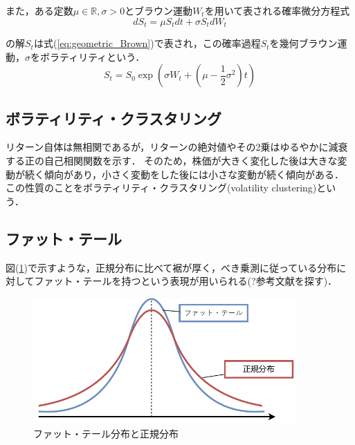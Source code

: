 \documentclass[titlepage]{jsreport}
\begin{document}
また，ある定数$\mu \in \mathbb{R}, \sigma > 0$とブラウン運動$W_t$を用いて表される確率微分方程式
\begin{equation}
    dS_t = \mu S_t dt + \sigma S_t dW_t \label{eq:geoBrow_equation}
\end{equation}

の解$S_t$は式(\ref{eq:geometric_Brown})で表され，この確率過程$S_t$を幾何ブラウン運動，$\sigma$をボラティリティという\cite{Stochastic_Calculus}．
\begin{equation}
    S_t = S_0 \exp{\left(\sigma W_t + \left( \mu - \frac{1}{2}\sigma^2 \right)t\right)} \label{eq:geometric_Brown}
\end{equation}

\subsection{ボラティリティ・クラスタリング}
リターン自体は無相関であるが，リターンの絶対値やその2乗はゆるやかに減衰する正の自己相関関数を示す\cite{Cont2007}．
そのため，株価が大きく変化した後は大きな変動が続く傾向があり，小さく変動をした後には小さな変動が続く傾向がある\cite{return_correlation}．
この性質のことをボラティリティ・クラスタリング(volatility clustering)という．

\subsection{ファット・テール}
図(\ref{fig:fat_tail})で示すような，正規分布に比べて裾が厚く，べき乗測に従っている分布に対してファット・テールを持つという表現が用いられる(?参考文献を探す)．
\begin{figure}[htbp]
    \centering
    \includegraphics[width=10cm]{fig/fat_tail.drawio.pdf}
    \caption{ファット・テール分布と正規分布}
    \label{fig:fat_tail}
\end{figure}
\end{document}
